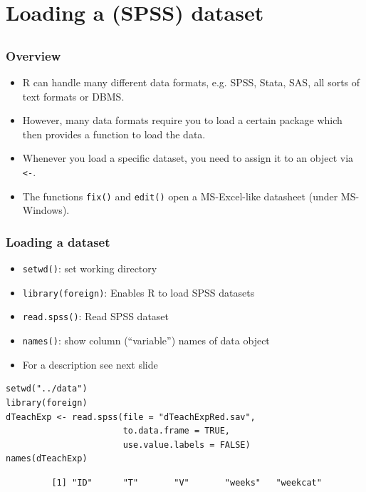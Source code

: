 \documentclass[bigger]{beamer}
\begin{document}
\section{Loading a (SPSS) dataset}
\label{sec-3}
\subsection{}
\begin{frame}
\frametitle{Overview}
\label{sec-3-1-1}

\begin{itemize}
\item R can handle many different data formats, e.g. SPSS, Stata, SAS, all sorts of text formats or DBMS.
\item However, many data formats require you to load a certain package which then provides a function to load the data.
\item Whenever you load a specific dataset, you need to assign it to an object via \texttt{<-}.
\item The functions \texttt{fix()} and \texttt{edit()} open a MS-Excel-like datasheet (under MS-Windows).
\end{itemize}
\end{frame}
\begin{frame}[fragile,shrink = 15]
\frametitle{Loading a dataset}
\label{sec-3-1-2}

\begin{itemize}
\item \texttt{setwd()}: set working directory
\item \texttt{library(foreign)}: Enables R to load SPSS datasets
\item \texttt{read.spss()}: Read SPSS dataset
\item \texttt{names()}: show column (\enquote{variable}) names of data object
\item For a description see next slide
\end{itemize}


\lstset{language=R}
\begin{lstlisting}
setwd("../data")
library(foreign)
dTeachExp <- read.spss(file = "dTeachExpRed.sav", 
                       to.data.frame = TRUE, 
                       use.value.labels = FALSE)
names(dTeachExp)
\end{lstlisting}

\begin{verbatim}
         [1] "ID"      "T"       "V"       "weeks"   "weekcat"
\end{verbatim}
\end{frame}
\end{document}
